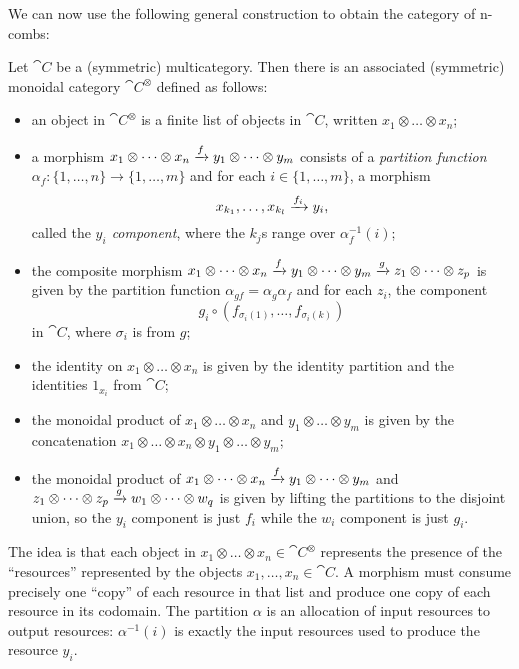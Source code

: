 We can now use the following general construction to obtain the category of
n-combs:

\begin{dfn}
  Let $\cat{C}$ be a (symmetric) multicategory. Then there is an associated
  (symmetric) monoidal category $\cat{C}^\otimes$ defined as follows:
  \begin{itemize}
    \item an object in $\cat{C}^\otimes$ is a finite list of objects in
      $\cat{C}$, written $x_1\otimes\dots\otimes x_n$;
    \item a morphism $x_1\otimes\dots\otimes x_n\xrightarrow{f} y_1\otimes \dots\otimes
      y_m$ consists of a \emph{partition function}
      $\alpha_f: \{1,\dots,n\}\to\{1,\dots,m\}$ and for each $i\in\{1,\dots,m\}$, a morphism \[
        x_{k_1}, \dots, x_{k_l}\xrightarrow{f_i} y_i,
      \] called the \emph{$y_i$ component}, where the $k_j$s range over
      $\alpha_f^{-1}(i)$;
    \item the composite morphism $x_1\otimes\dots\otimes
      x_n\xrightarrow{f}y_1\otimes\dots\otimes y_m\xrightarrow{g}z_1\otimes\dots\otimes z_p$ is
      given by the partition function $\alpha_{gf} = \alpha_g\alpha_f$ and for
      each $z_i$, the component \[
        g_i\circ(f_{\sigma_i(1)},\dots,f_{\sigma_i(k)})
      \]in $\cat{C}$, where $\sigma_i$ is from $g$;
    \item the identity on $x_1\otimes\dots\otimes x_n$ is given by the identity
      partition and the identities $1_{x_i}$ from $\cat{C}$;
    \item the monoidal product of $x_1\otimes\dots\otimes x_n$ and
      $y_1\otimes\dots\otimes y_m$ is given by the concatenation
      $x_1\otimes\dots\otimes x_n\otimes y_1\otimes \dots\otimes y_m$;
    \item the monoidal product of $x_1\otimes\dots\otimes x_n\xrightarrow{f} y_1\otimes\dots\otimes y_m$
      and $z_1\otimes\dots\otimes z_p\xrightarrow{g} w_1\otimes\dots\otimes w_q$ is given
      by lifting the partitions to the disjoint union, so the $y_i$
      component is just $f_i$ while the $w_i$ component is just $g_i$.
  \end{itemize}
\end{dfn}

The idea is that each object in $x_1\otimes\dots\otimes x_n\in\cat{C}^\otimes$
represents the presence of the ``resources'' represented by the objects
$x_1,\dots,x_n\in\cat{C}$. A morphism must consume precisely one ``copy'' of
each resource in that list and produce one copy of each resource in its
codomain. The partition $\alpha$ is an allocation of input resources to output
resources: $\alpha^{-1}(i)$ is exactly the input resources used to produce the
resource $y_i$.

